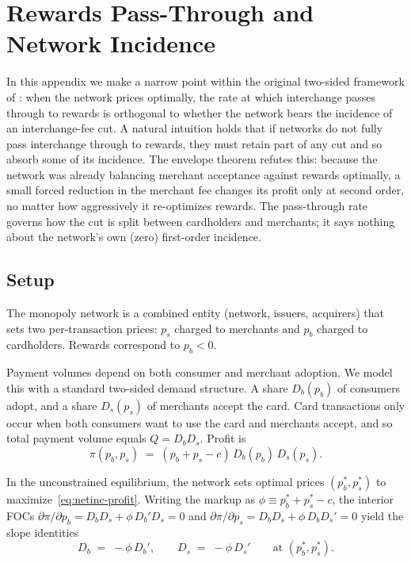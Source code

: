 \documentclass[main.tex]{subfiles}
\begin{document}
\section{Rewards Pass-Through and Network Incidence}\label{sec:appendix-network-incidence}

In this appendix we make a narrow point within the original two-sided framework of \citet{Rochet.Tirole2003}: when the network prices optimally, the rate at which interchange passes through to rewards is orthogonal to whether the network bears the incidence of an interchange-fee cut.
A natural intuition holds that if networks do not fully pass interchange through to rewards, they must retain part of any cut and so absorb some of its incidence.
The envelope theorem refutes this: because the network was already balancing merchant acceptance against rewards optimally, a small forced reduction in the merchant fee changes its profit only at second order, no matter how aggressively it re-optimizes rewards.
The pass-through rate governs how the cut is split between cardholders and merchants; it says nothing about the network's own (zero) first-order incidence.

\subsection{Setup}\label{subsec:netinc-setup}

The monopoly network is a combined entity (network, issuers, acquirers) that sets two per-transaction prices: $p_s$ charged to merchants and $p_b$ charged to cardholders.
Rewards correspond to $p_b<0$.

Payment volumes depend on both consumer and merchant adoption. We model this with a standard two-sided demand structure.
A share $D_b(p_b)$ of consumers adopt, and a share $D_s(p_s)$ of merchants accept the card.
Card transactions only occur when both consumers want to use the card and merchants accept, and so total payment volume equals $Q=D_b D_s$.
Profit is
\begin{equation}
\pi(p_b,p_s)\;=\;(p_b+p_s-c)\,D_b(p_b)\,D_s(p_s).
\label{eq:netinc-profit}
\end{equation}

In the unconstrained equilibrium, the network sets optimal prices $(p_b^*,p_s^*)$ to maximize~\eqref{eq:netinc-profit}.
Writing the markup as $\phi\equiv p_b^*+p_s^*-c$, the interior FOCs $\partial\pi/\partial p_b=D_b D_s+\phi\,D_b'D_s=0$ and $\partial\pi/\partial p_s=D_b D_s+\phi\,D_b D_s'=0$ yield the slope identities
\begin{equation}
D_b\;=\;-\phi\,D_b',\qquad D_s\;=\;-\phi\,D_s'\qquad\text{at }(p_b^*,p_s^*).
\label{eq:netinc-foc-identities}
\end{equation}
\end{document}
